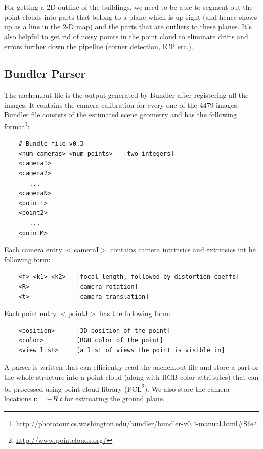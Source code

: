 \documentclass[10pt,twocolumn,letterpaper]{article}
\begin{document}
For getting a 2D outline of the buildings, we need to be able to segment out the point clouds into parts that belong to a plane which is up-right (and hence shows up as a line in the 2-D map) and the parts that are outliers to these planes. It's also helpful to get rid of noisy points in the point cloud to eliminate drifts and errors further down the pipeline (corner detection, ICP etc.). 

\subsection{Bundler Parser}
The aachen.out file is the output generated by Bundler after registering all the images. It contains the camera calibration for every one of the 4479 images. Bundler file consists of the estimated scene geometry and has the following format\footnote{\url{http://phototour.cs.washington.edu/bundler/bundler-v0.4-manual.html\#S6}}:

{\scriptsize
\begin{verbatim}
    # Bundle file v0.3
    <num_cameras> <num_points>   [two integers]
    <camera1>
    <camera2>
       ...
    <cameraN>
    <point1>
    <point2>
       ...
    <pointM>
\end{verbatim}
}

Each camera entry $<$cameraI$>$ contains camera intrinsics and extrinsics int he following form:

{\scriptsize
\begin{verbatim}
    <f> <k1> <k2>   [focal length, followed by distortion coeffs]
    <R>             [camera rotation]
    <t>             [camera translation]
\end{verbatim}
}

Each point entry $<$pointJ$>$ has the following form:

{\scriptsize
\begin{verbatim}
    <position>      [3D position of the point]
    <color>         [RGB color of the point]
    <view list>     [a list of views the point is visible in]
\end{verbatim}
}

A parser is written that can efficiently read the aachen.out file and store a part or the whole structure into a point cloud (along with RGB color attributes) that can be processed using point cloud library (PCL\footnote{\url{http://www.pointclouds.org/}}). We also store the camera locations $\textbf{c} = -R^{'}t$ for estimating the ground plane.
\end{document}
